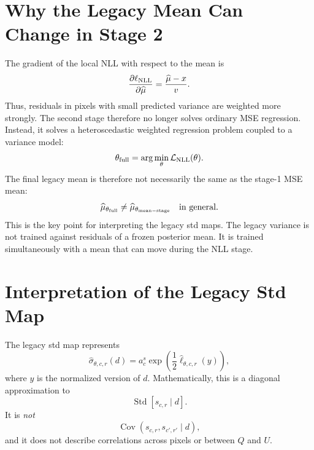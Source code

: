 \documentclass[11pt]{article}
\newcommand{\mean}{\mu}
\newcommand{\logvar}{\ell}
\newcommand{\std}{\sigma}
\newcommand{\pix}{r}
\newcommand{\chan}{c}
\begin{document}
\section{Why the Legacy Mean Can Change in Stage 2}

The gradient of the local NLL with respect to the mean is
\[
  \frac{\partial \ell_{\rm NLL}}{\partial \widehat{\mean}}
  =
  \frac{
    \widehat{\mean}-x
  }{
    v
  }.
\]
Thus, residuals in pixels with small predicted variance are weighted more
strongly.  The second stage therefore no longer solves ordinary MSE regression.
Instead, it solves a heteroscedastic weighted regression problem coupled to a
variance model:
\[
  \theta_{\rm full}
  =
  \arg\min_{\theta}
  \mathcal{L}_{\rm NLL}(\theta).
\]
The final legacy mean is therefore not necessarily the same as the stage-1 MSE
mean:
\[
  \widehat{\mean}_{\theta_{\rm full}}
  \neq
  \widehat{\mean}_{\theta_{\rm mean-stage}}
  \quad\text{in general}.
\]
This is the key point for interpreting the legacy std maps.  The legacy
variance is not trained against residuals of a frozen posterior mean.  It is
trained simultaneously with a mean that can move during the NLL stage.

\section{Interpretation of the Legacy Std Map}

The legacy std map represents
\[
  \widehat{\std}_{\theta,\chan,\pix}(d)
  =
  a^s_{\chan}
  \exp\!\left(
    \frac{1}{2}
    \widehat{\logvar}_{\theta,\chan,\pix}(y)
  \right),
\]
where \(y\) is the normalized version of \(d\).  Mathematically, this is a
diagonal approximation to
\[
  \operatorname{Std}\!\left[
    s_{\chan,\pix}\mid d
  \right].
\]
It is \emph{not}
\[
  \operatorname{Cov}(s_{\chan,\pix},s_{\chan',\pix'}\mid d),
\]
and it does not describe correlations across pixels or between \(Q\) and \(U\).
\end{document}

